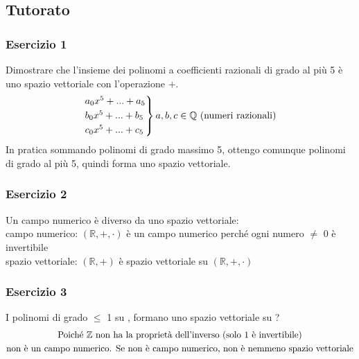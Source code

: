 \documentclass[italian]{article}
\newcommand{\ins}[1]{\text{$\mathbb{#1}$}}
\begin{document}
\newpage
\subsection{Tutorato}
\subsubsection{Esercizio 1}
Dimostrare che l'insieme dei polinomi a coefficienti razionali di grado al più 5 è uno spazio vettoriale con l'operazione $+$.
\begin{gather*}
	\begin{rcases*}
		a_0x^5 + ... + a_5 \\
		b_0x^5 + ... + b_5 \\
		c_0x^5 + ... + c_5 \\
	\end{rcases*}
	a,b,c \in \ins{Q} \text{ (numeri razionali)}
\end{gather*}
In pratica sommando polinomi di grado massimo 5, ottengo comunque polinomi di grado al più 5, quindi forma uno spazio vettoriale.

\subsubsection{Esercizio 2}
Un campo numerico è diverso da uno spazio vettoriale:\\
campo numerico: $(\ins{R}, + , \cdot)$ è un campo numerico perché ogni numero $\neq$ 0 è invertibile\\
spazio vettoriale: $(\ins{R}, +)$ è spazio vettoriale su $(\ins{R}, + , \cdot)$

\subsubsection{Esercizio 3}
I polinomi di grado $\leq$ 1 su \ins{Z}, formano uno spazio vettoriale su \ins{Z}?
\begin{gather*}
	\text{Poiché \ins{Z} non ha la proprietà dell'inverso (solo 1 è invertibile)}\\
	\text{non è un campo numerico. Se non è campo numerico, non è nemmeno spazio vettoriale}
\end{gather*}
\end{document}
